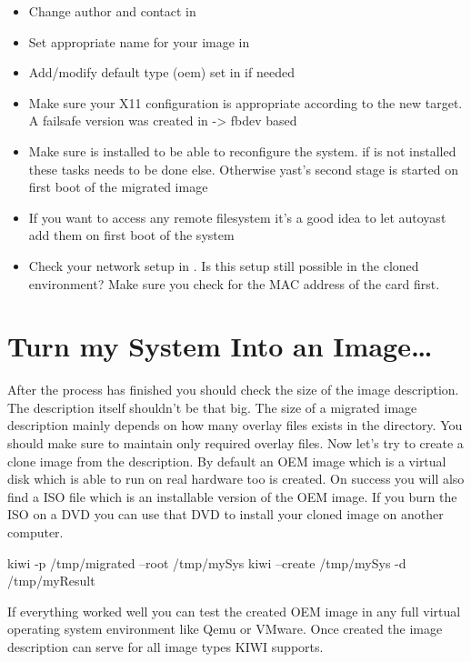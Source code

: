 \begin{itemize}
\item Change author and contact in 
\item Set appropriate name for your image in 
\item Add/modify default type (oem) set in  if needed
\item Make sure your X11 configuration is appropriate according to
      the new target. A failsafe version was created in
      -> fbdev based
\item Make sure  is installed to be able to reconfigure
      the system. if  is not installed these tasks needs to
      be done else. Otherwise yast's second stage is started on first
      boot of the migrated image
\item If you want to access any remote filesystem it's a good
      idea to let autoyast add them on first boot of the system
\item Check your network setup in .
      Is this
      setup still possible in the cloned environment? Make sure you
      check for the MAC address of the card first.
\end{itemize}

\section{Turn my System Into an Image\ldots}
After the process has finished you should check the size of the
image description. The description itself shouldn't be that big.
The size of a migrated image description mainly depends on how many
overlay files exists in the  directory. You should make
sure to maintain only required overlay files. Now let's try to create a
clone image from the description. By default an OEM image which is
a virtual disk which is able to run on real hardware too is created.
On success you will also find a ISO file which is an installable
version of the OEM image. If you burn the ISO on a DVD you can use
that DVD to install your cloned image on another computer.

\begin{Command}{8cm}
kiwi -p /tmp/migrated --root /tmp/mySys
kiwi --create /tmp/mySys -d /tmp/myResult
\end{Command}

If everything worked well you can test the created OEM
image in any full virtual operating system environment like Qemu or
VMware. Once created the image description can serve for all image
types KIWI supports.
 
